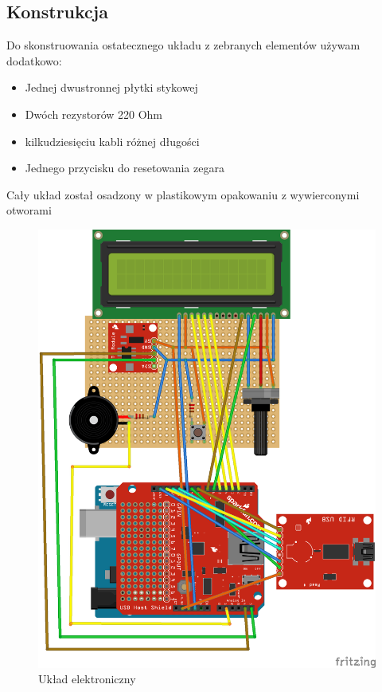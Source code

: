 \documentclass[declaration,shortabstract, mgr]{iithesis}
\begin{document}
\subsection{Konstrukcja}
\indent Do skonstruowania ostatecznego układu z zebranych elementów używam dodatkowo:
\begin{itemize}
\item Jednej dwustronnej płytki stykowej
\item Dwóch rezystorów 220 Ohm
\item kilkudziesięciu kabli różnej długości
\item Jednego przycisku do resetowania zegara
\end{itemize}
\indent Cały układ został osadzony w plastikowym opakowaniu z wywierconymi otworami\\
\begin{figure}[h]
\caption{Układ elektroniczny}
\centering
\includegraphics{circuit.png}
\end{figure}
\end{document}
